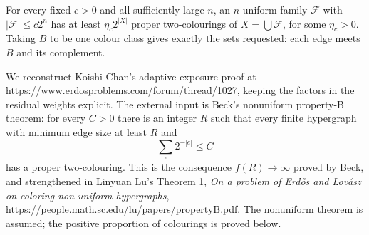 For every fixed $c>0$ and all sufficiently large $n$, an $n$-uniform family $\mathcal F$ with $|\mathcal F|\le c2^n$ has at least $\eta_c2^{|X|}$ proper two-colourings of $X=\bigcup\mathcal F$, for some $\eta_c>0$. Taking $B$ to be one colour class gives exactly the sets requested: each edge meets $B$ and its complement.

We reconstruct Koishi Chan's adaptive-exposure proof at \url{https://www.erdosproblems.com/forum/thread/1027}, keeping the factors in the residual weights explicit. The external input is Beck's nonuniform property-B theorem: for every $C>0$ there is an integer $R$ such that every finite hypergraph with minimum edge size at least $R$ and
\[
 \sum_e2^{-|e|}\le C
\]
has a proper two-colouring. This is the consequence $f(R)\to\infty$ proved by Beck, and strengthened in Linyuan Lu's Theorem 1, \emph{On a problem of Erd\H{o}s and Lov\'asz on coloring non-uniform hypergraphs}, \url{https://people.math.sc.edu/lu/papers/propertyB.pdf}. The nonuniform theorem is assumed; the positive proportion of colourings is proved below.
